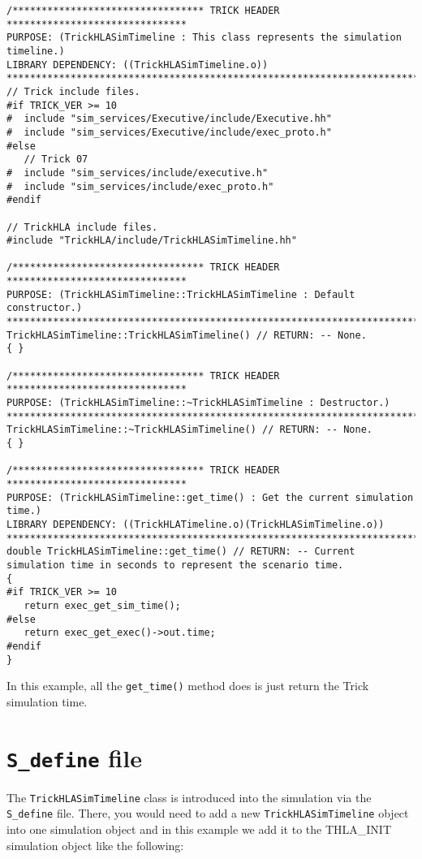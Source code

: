 \begin{lstlisting}[caption={ {\tt TrickHLASimTimeline} code}]
/********************************* TRICK HEADER *******************************
PURPOSE: (TrickHLASimTimeline : This class represents the simulation timeline.)
LIBRARY DEPENDENCY: ((TrickHLASimTimeline.o))
*******************************************************************************/
// Trick include files.
#if TRICK_VER >= 10
#  include "sim_services/Executive/include/Executive.hh"
#  include "sim_services/Executive/include/exec_proto.h"
#else
   // Trick 07
#  include "sim_services/include/executive.h"
#  include "sim_services/include/exec_proto.h"
#endif

// TrickHLA include files.
#include "TrickHLA/include/TrickHLASimTimeline.hh"

/********************************* TRICK HEADER *******************************
PURPOSE: (TrickHLASimTimeline::TrickHLASimTimeline : Default constructor.)
*******************************************************************************/
TrickHLASimTimeline::TrickHLASimTimeline() // RETURN: -- None.
{ }

/********************************* TRICK HEADER *******************************
PURPOSE: (TrickHLASimTimeline::~TrickHLASimTimeline : Destructor.)
*******************************************************************************/
TrickHLASimTimeline::~TrickHLASimTimeline() // RETURN: -- None.
{ }

/********************************* TRICK HEADER *******************************
PURPOSE: (TrickHLASimTimeline::get_time() : Get the current simulation time.)
LIBRARY DEPENDENCY: ((TrickHLATimeline.o)(TrickHLASimTimeline.o))
*******************************************************************************/
double TrickHLASimTimeline::get_time() // RETURN: -- Current simulation time in seconds to represent the scenario time.
{
#if TRICK_VER >= 10
   return exec_get_sim_time();
#else
   return exec_get_exec()->out.time;
#endif
}
\end{lstlisting}

In this example, all the {\tt get\_time()} method does is just return the
Trick simulation time.

\section{{\tt S\_define} file}

The {\tt TrickHLASimTimeline} class is introduced into the simulation via 
the {\tt S\_define} file. There, you would need to add a 
new {\tt TrickHLASimTimeline} object into one simulation object and in this
example we add it to the THLA\_INIT simulation object like the following:

